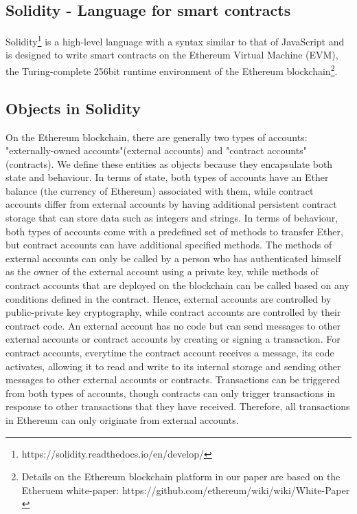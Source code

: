 \documentclass[a4paper,11pt,twoside]{article}
\begin{document}
{\subsection{Solidity - Language for smart contracts}
Solidity\footnote{https://solidity.readthedocs.io/en/develop/} is a high-level language with a syntax similar to that of JavaScript and is designed to write smart contracts on the Ethereum Virtual Machine (EVM), the Turing-complete 256bit runtime environment of the Ethereum blockchain\footnote{Details on the Ethereum blockchain platform in our paper are based on the Etheruem white-paper: https://github.com/ethereum/wiki/wiki/White-Paper\\}.

\subsection{Objects in Solidity}
On the Ethereum blockchain, there are generally two types of accounts: "externally-owned accounts"(external accounts)  and "contract accounts"(contracts). We define these entities as objects because they encapsulate both state and behaviour. In terms of state, both types of accounts have an Ether balance (the currency of Ethereum) associated with them, while contract accounts differ from external accounts by having additional persistent contract storage that can store data such as integers and strings. In terms of behaviour, both types of accounts come with a predefined set of methods to transfer Ether, but contract accounts can have additional specified methods. The methods of external accounts can only be called by a person who has authenticated himself as the owner of the external account using a private key, while methods of contract accounts that are deployed on the blockchain can be called based on any conditions defined in the contract.
Hence, external accounts are controlled by public-private key cryptography, while contract accounts are controlled by their contract code. An external account has no code but can send messages to other external accounts or contract accounts by creating or signing a transaction. For contract accounts, everytime the contract account receives a message, its code activates, allowing it to read and write to its internal storage and sending other messages to other external accounts or contracts. Transactions can be triggered from both types of accounts, though contracts can only trigger transactions in response to other transactions that they have received. Therefore, all transactions in Ethereum can only originate from external accounts.

}
\end{document}
